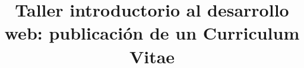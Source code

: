 \title{Taller introductorio al desarrollo web: publicación de un Curriculum Vitae}
\maketitle
\renewcommand*\contentsname{Contenido}
\tableofcontents
\pagebreak
